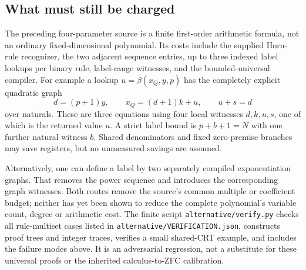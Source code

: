 \subsection{What must still be charged}

The preceding four-parameter source is a finite first-order arithmetic
formula, not an ordinary fixed-dimensional polynomial. Its costs include
the supplied Horn-rule recognizer, the two adjacent sequence entries,
up to three indexed label lookups per binary rule, label-range witnesses,
and the bounded-universal compiler. For example a lookup
$u=\beta(x_Q,y,p)$ has the completely explicit quadratic graph
\[
 d=(p+1)y,\qquad x_Q=(d+1)k+u,\qquad u+s=d
\]
over naturals. These are three equations using four local witnesses
$d,k,u,s$, one of which is the returned value $u$. A strict label bound
is $p+b+1=N$ with one further natural witness $b$.
Shared denominators and fixed zero-premise branches may save registers,
but no unmeasured savings are assumed.

Alternatively, one can define a label by two separately compiled
exponentiation graphs. That removes the power sequence and introduces the
corresponding graph witnesses. Both routes remove the source's common
multiple or coefficient budget; neither has yet been shown to reduce the
complete polynomial's variable count, degree or arithmetic cost.
The finite script \texttt{alternative/verify.py} checks all rule-multiset cases
listed in \texttt{alternative/VERIFICATION.json}, constructs proof trees and
integer traces, verifies a small shared-CRT example, and includes the
failure modes above. It is an adversarial regression, not a substitute
for these universal proofs or the inherited calculus-to-ZFC calibration.
